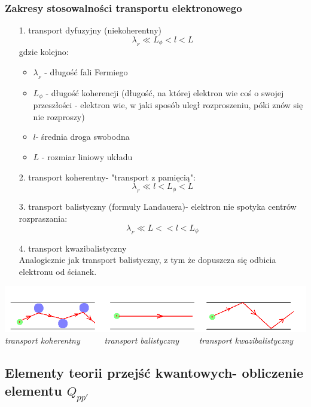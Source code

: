 \subsubsection{Zakresy stosowalności transportu elektronowego}
\begin{itemize}
\item[1.] transport dyfuzyjny (niekoherentny)
\begin{equation}\lambda_{_F} \ll L_\phi < l < L\end{equation}
gdzie kolejno:
	\begin{itemize}
	\item $\lambda_{_F}$ - długość fali Fermiego
	\item $L_\phi$ - długość koherencji (długość, na której elektron wie coś o swojej przeszłości - elektron wie, w jaki sposób uległ rozproszeniu, póki znów się nie rozproszy)
	\item $l$- średnia droga swobodna
	\item $L$ - rozmiar liniowy układu
	\end{itemize}
\item[2.] transport koherentny- "transport z pamięcią":
\begin{equation}\lambda_{_F} \ll l < L_\phi <L\end{equation}
\item[3.] transport balistyczny (formuły Landauera)- elektron nie spotyka centrów rozpraszania:
\begin{equation}\lambda_{_F} \ll L < <l< L_\phi \end{equation}
\item[4.] transport kwazibalistyczny \\
Analogicznie jak transport balistyczny, z tym że dopuszcza się odbicia elektronu od ścianek.
\end{itemize}
\begin{center}\includegraphics[scale=0.5]{obrazki/wykl_8_obrazek3.png}\\
\textit{transport koherentny ~~~~~transport balistyczny~~~~ transport kwazibalistyczny}
\end{center}
\subsection{Elementy teorii przejść kwantowych- obliczenie elementu $Q_{pp'}$}
